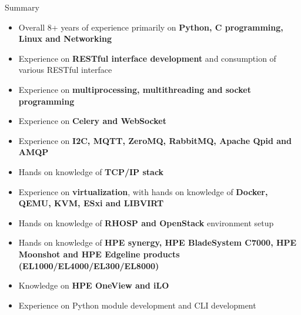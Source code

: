 \documentclass{resume} %
\begin{document}
  



\begin{rSection}{Summary}
\begin{itemize}
\setlength\itemsep{-1pt}
\item Overall 8+ years of experience primarily on \textbf{Python, C programming, Linux and Networking}
\item Experience on \textbf{RESTful interface development} and consumption of various RESTful interface
\item Experience on \textbf{multiprocessing, multithreading and socket programming}
\item Experience on \textbf{Celery and WebSocket}
\item Experience on \textbf{I2C, MQTT, ZeroMQ, RabbitMQ, Apache Qpid and AMQP}
\item Hands on knowledge of \textbf{TCP/IP stack}
\item Experience on \textbf{virtualization}, with hands on knowledge of \textbf{Docker, QEMU, KVM, ESxi and LIBVIRT}
\item Hands on knowledge of \textbf{RHOSP and OpenStack} environment setup
\item Hands on knowledge of \textbf{HPE synergy, HPE BladeSystem C7000, HPE Moonshot and HPE Edgeline products (EL1000/EL4000/EL300/EL8000)}
\item Knowledge on \textbf{HPE OneView and iLO}
\item Experience on Python module development and CLI development
\end{itemize}



\end{rSection}

\end{document}
